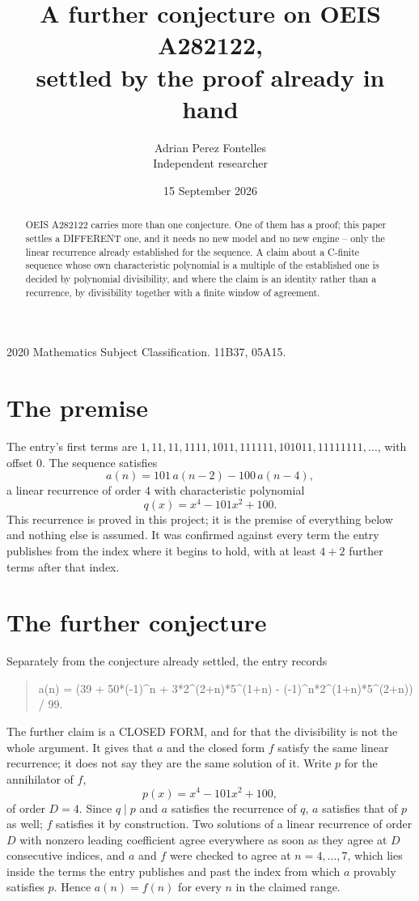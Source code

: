 \documentclass[11pt,a4paper]{article}
\title{A further conjecture on OEIS A282122,\\ \large settled by the proof already in hand}
\author{Adrian Perez Fontelles\\ \small Independent researcher}
\date{15 September 2026}
\theoremstyle{plain}
\theoremstyle{definition}
\begin{document}
\maketitle

\begin{abstract}
OEIS A282122 carries more than one conjecture. One of them has a proof; this paper settles a
DIFFERENT one, and it needs no new model and no new engine -- only the linear recurrence already
established for the sequence. A claim about a C-finite sequence whose own characteristic
polynomial is a multiple of the established one is decided by polynomial divisibility, and where
the claim is an identity rather than a recurrence, by divisibility together with a finite window
of agreement.
\end{abstract}

\noindent\small 2020 Mathematics Subject Classification. 11B37, 05A15.\normalsize

\section{The premise}

The entry's first terms are $1, 11, 11, 1111, 1011, 111111, 101011, 11111111,\dots$, with offset $0$. The sequence satisfies
\[
  a(n)=101\,a(n-2) - 100\,a(n-4) ,
\]
a linear recurrence of order $4$ with characteristic polynomial
\[
  q(x)=x^{4} - 101 x^{2} + 100 .
\]
This recurrence is proved in this project; it is the premise of everything below and nothing else is assumed.
It was confirmed against every term the entry publishes from the index where it begins to hold,
with at least $4+2$ further terms after that index.

\section{The further conjecture}

Separately from the conjecture already settled, the entry records

\begin{quote}\raggedright a(n) = (39 + 50*(-1)\^{}n + 3*2\^{}(2+n)*5\^{}(1+n) - (-1)\^{}n*2\^{}(1+n)*5\^{}(2+n)) / 99.\end{quote}

The further claim is a CLOSED FORM, and for that the divisibility is not the whole argument. It
gives that $a$ and the closed form $f$ satisfy the same linear recurrence; it does not say they
are the same solution of it. Write $p$ for the annihilator of $f$,
\[
  p(x)=x^{4} - 101 x^{2} + 100 ,
\]
of order $D=4$. Since $q\mid p$ and $a$ satisfies the recurrence of $q$, $a$ satisfies that of
$p$ as well; $f$ satisfies it by construction. Two solutions of a linear recurrence of order $D$
with nonzero leading coefficient agree everywhere as soon as they agree at $D$ consecutive
indices, and $a$ and $f$ were checked to agree at $n=4,\dots,7$,
which lies inside the terms the entry publishes and past the index from which $a$ provably
satisfies $p$. Hence $a(n)=f(n)$ for every $n$ in the claimed range.
\end{document}
